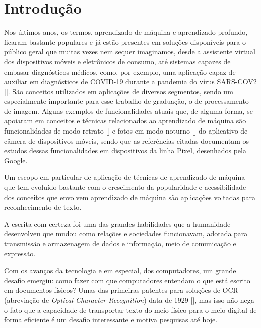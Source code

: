 
\chapter[Introdução]{Introdução}

Nos últimos anos, os termos, aprendizado de máquina e aprendizado profundo, ficaram bastante populares e já estão presentes em soluções 
disponíveis para o público geral que muitas vezes nem sequer imaginamos, desde a assistente virtual dos dispositivos móveis e eletrônicos 
de consumo, até sistemas capazes de embasar diagnósticos médicos, como, por exemplo, uma aplicação capaz de auxiliar em diagnósticos de 
COVID-19 durante a pandemia do vírus SARS-COV2 []. São conceitos utilizados em aplicações de diversos segmentos, 
sendo um especialmente importante para esse trabalho de graduação, o de processamento de imagem. Alguns exemplos de funcionalidades atuais 
que, de alguma forma, se apoiaram em conceitos e técnicas relacionados ao aprendizado de máquina são funcionalidades de modo retrato [] 
e fotos em modo noturno [] do aplicativo de câmera de dispositivos móveis, sendo que as referências citadas documentam 
os estudos dessas funcionalidades em dispositivos da linha Pixel, desenhados pela Google.

Um escopo em particular de aplicação de técnicas de aprendizado de máquina que tem evoluído bastante com o crescimento da popularidade e 
acessibilidade dos conceitos que envolvem aprendizado de máquina são aplicações voltadas para reconhecimento de texto. 

A escrita com certeza foi uma das grandes habilidades que a humanidade desenvolveu que mudou como relações e sociedades funcionavam, adotada 
para transmissão e armazenagem de dados e informação, meio de comunicação e expressão.

Com os avanços da tecnologia e em especial, dos computadores, um grande desafio emergiu: como fazer com que computadores entendam o que está 
escrito em documentos físicos? Umas das primeiras patentes para soluções de OCR (abreviação de \textit{Optical Character Recognition}) data 
de 1929 [], mas isso não nega o fato que a capacidade de transportar texto do meio físico para o meio digital de 
forma eficiente é um desafio interessante e motiva pesquisas até hoje.

